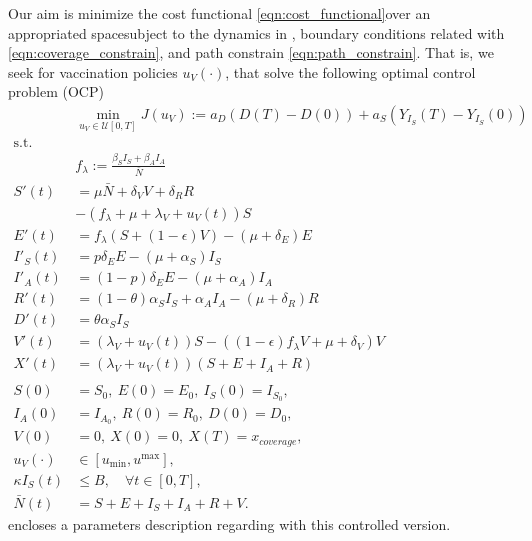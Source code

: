 Our aim is minimize the cost functional
\eqref{eqn:cost_functional}\textemdash over an appropriated
space\textemdash subject to the dynamics in
, boundary conditions related with
\eqref{eqn:coverage_constrain}, and path
constrain \eqref{eqn:path_constrain}.
That is, we seek for vaccination policies $u_V(\cdot)$, that
solve the following optimal control problem (OCP)%
\begin{equation}
    \label{eqn:optimal_control_problem}
    \begin{aligned}
        & \min_{u_V \in \mathcal{U}[0, T]}
        J(u_V) :=
        a_D ( D(T) - D(0)) +
        a_S (Y_{I_S}(T) - Y_{I_S}(0))
        \\
        \text{s.t.} &
        \\
        &f_{\lambda}
        :=
        \frac{\beta_S I_S + \beta_AI_A}{\bar{N}}
        \\
        S'(t)
        &=
        \mu \bar{N} + \delta_V V + \delta_R R
        \\
        &-
        (f_{\lambda} + \mu + \lambda_V +  u_V(t)) S
        \\
        E'(t)
        &=
        f_{\lambda} (S + (1-\epsilon) V)
        - (\mu+\delta_E) E
        \\
        I'_S(t)
        &=p
        \delta_E
        E-(\mu + \alpha_S) I_S
        \\
        I'_A(t)
        &= (1 - p) \delta_E E-(\mu + \alpha_A) I_A
        \\
        R'(t)
        &= (1 - \theta) \alpha_S I_S + \alpha_A I_A
        - (\mu + \delta_R) R
        \\
        D'(t)&=
        \theta \alpha_S I_S
        \\
        V'(t)&=
        (\lambda_V + u_V(t)) S -
        \left(
        (1 -\epsilon) f_{\lambda} V +
        \mu + \delta_V
        \right) V
        \\
        X'(t)&=
        (\lambda_V + u_V(t))(S + E + I_A + R)
        \\
        \\
        S(0) &= S_0, \ E(0) = E_0, \ I_S(0) = I_{S_{0}},
        \\
        I_A(0) &= I_{A_{0}}, \ R(0) = R_0, \ D(0) = D_0,
        \\
        V(0) &= 0, \ X(0) = 0, \ X(T) = x_{coverage},
        \\
        u_V(\cdot) & \in [u_{\min}, u^{\max}],
        \\
        \kappa I_S(t) & \leq B, \quad \forall t \in [0, T],
        \\
        \bar{N}(t) &= S + E + I_S + I_A + R + V.
    \end{aligned}
\end{equation}
 encloses a parameters description
regarding with this controlled
version.

